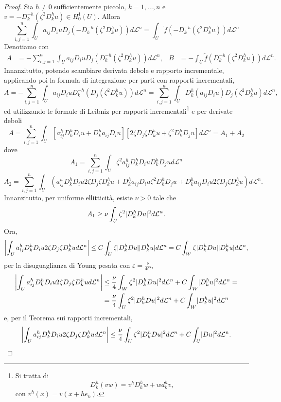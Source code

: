 \begin{proof}
	Sia $h \ne 0$ sufficientemente piccolo, $ k =1,\dots, n$ e $v = -D_k^{-h}(\zeta^2D^h_ku) \in H^1_0(U)$. Allora
	\[ \sum_{i,j=1}^n \int_U a_{ij}D_i u D_j \left(-D_k^{-h}(\zeta^2D^h_ku) \right)  d\mathcal{L}^n = \int_U \tilde{f}\left(-D_k^{-h}(\zeta^2D^h_ku) \right)  d\mathcal{L}^n \]
	Denotiamo con 
	\begin{align*}
		A&=-\sum_{i,j=1}^n \int_U a_{ij}D_i u D_j \left(D_k^{-h}(\zeta^2D^h_ku) \right)  d\mathcal{L}^n, & B&=-\int_U \tilde{f}\left(D_k^{-h}(\zeta^2D^h_ku) \right)  d\mathcal{L}^n.
	\end{align*}
	Innanzitutto, potendo scambiare derivata debole e rapporto incrementale, applicando poi la formula di integrazione per parti con rapporti incrementali,
	\[ A=-\sum_{i,j=1}^n \int_U a_{ij}D_i u D_k^{-h} \left(D_j(\zeta^2D^h_ku) \right)  d\mathcal{L}^n =\sum_{i,j=1}^n \int_U D_k^{h}\left( a_{ij}D_i u\right)D_j(\zeta^2D^h_ku)d\mathcal{L}^n, \]
	ed utilizzando le formule di Leibniz per rapporti incrementali\footnote{Si tratta di 
		\[ D_k^h(vw) = v^hD_k^hw + w d^h_kv, \]
		con $v^h(x) = v(x+he_k)$.} e per derivate deboli
	\[ A =\sum_{i,j=1}^n \int_U \left[a^h_{ij}D^h_kD_iu + D^h_ka_{ij}D_iu \right]\left[2\zeta D_j \zeta D^h_ku+\zeta^2D^h_kD_ju \right]  d\mathcal{L}^n = A_1 + A_2 \]
	dove
	\[ A_1 = \sum_{i,j=1}^n \int_U \zeta^2a^h_{ij}D^h_kD_iuD^h_kD_ju d\mathcal{L}^n \]
	\[ A_2 = \sum_{i,j=1}^n \int_U \left(a^h_{ij}D^h_kD_iu2\zeta D_j \zeta D^h_ku + D^h_ka_{ij}D_iu\zeta^2D^h_kD_ju + D^h_ka_{ij}D_iu2\zeta D_j \zeta D^h_ku \right)  d\mathcal{L}^n. \]
	Innanzitutto, per uniforme ellitticità, esiste $\nu > 0$ tale che
	\[ A_1\ge \nu \int_U \zeta^2 \abs{D^h_kDu}^2 d\mathcal{L}^n.  \]
	Ora,
	\[ \abs*{\int_U a^h_{ij}D^h_kD_iu2\zeta D_j \zeta D^h_ku d\mathcal{L}^n} \le C \int_U \zeta \abs{D^h_kDu}\abs{D^h_ku}d\mathcal{L}^n = C \int_W \zeta\abs{D^h_kDu}\abs{D^h_ku}d\mathcal{L}^n,  \]
	per la disuguaglianza di Young pesata con $\varepsilon = \frac{\nu}{4C}$,
	\begin{align*}
		\abs*{\int_U a^h_{ij}D^h_kD_iu2\zeta D_j \zeta D^h_ku d\mathcal{L}^n} &\le \frac{\nu}{4}\int_W \zeta^2 \abs{D^h_kDu}^2d\mathcal{L}^n + C \int_W \abs{D^h_ku}^2d\mathcal{L}^n = \\
		&=\frac{\nu}{4}\int_U \zeta^2 \abs{D^h_kDu}^2d\mathcal{L}^n + C \int_W \abs{D^h_ku}^2d\mathcal{L}^n
	\end{align*}
	e, per il Teorema sui rapporti incrementali,
	\[ \abs*{\int_U a^h_{ij}D^h_kD_iu2\zeta D_j \zeta D^h_ku d\mathcal{L}^n} \le  \frac{\nu}{4}\int_U \zeta^2 \abs{D^h_kDu}^2d\mathcal{L}^n + C \int_U \abs{Du}^2d\mathcal{L}^n.\]

\end{proof}
